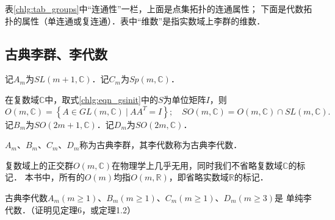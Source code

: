 {\kaishu 表\ref{chlg:tab_groups}中“连通性”一栏，上面是点集拓扑的连通属性；
下面是代数拓扑的属性（单连通或复连通）．表中“维数”是指实数域上李群的维数．}



\subsection{古典李群、李代数}\label{chlg:sec_clg}
  

记$A_m$为$SL(m+1,\mathbb{C})$．记$C_m$为$Sp(m,\mathbb{C})$．

在复数域$\mathbb{C}$中，取式\eqref{chlg:eqn_gsinit}中的$S$为单位矩阵$I$，则
\begin{equation*}
    O(m,\mathbb{C}) = \left\{ A \in GL(m,\mathbb{C})\ |\ A A^T =I \right\};
    \quad SO(m,\mathbb{C}) = O(m,\mathbb{C}) \cap SL(m,\mathbb{C}).
\end{equation*}
记$B_m$为$SO(2m+1,\mathbb{C})$．记$D_m$为$SO(2m,\mathbb{C})$．

$A_m$、$B_m$、$C_m$、$D_m$称为{\heiti 古典李群}，其李代数称为{\heiti 古典李代数}．

复数域上的正交群$O(m,\mathbb{C})$在物理学上几乎无用，同时我们不省略复数域$\mathbb{C}$的标记．
本书中，所有的$O(m)$均指$O(m,\mathbb{R})$，即省略实数域$\mathbb{R}$的标记．


\begin{theorem}\label{chlg:thm_CLA-simple}
    古典李代数$A_m(m\geqslant 1)$、$B_m(m\geqslant 1)$、$C_m(m\geqslant 1)$、$D_m(m\geqslant 3)$是
    单纯李代数．（证明见\parencite[p.148]{huangxg-2024}定理6，或\parencite[\S 1.3]{wanzx-2013}定理1.2）
\end{theorem}







